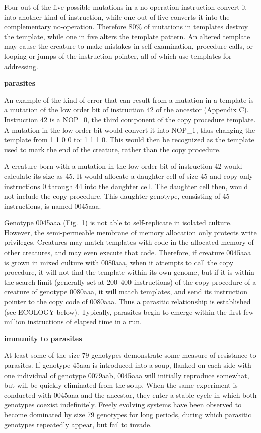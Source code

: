 Four out of the five possible mutations in a no-operation instruction convert
it into another kind of instruction, while one out of five converts it into
the complementary no-operation.  Therefore 80\% of mutations in templates
destroy the template, while one in five alters the template pattern.  An
altered template may cause the creature to make mistakes in self examination,
procedure calls, or looping or jumps of the instruction pointer, all of which
use templates for addressing.

\LP
\bf parasites\rm
\eLP

An example of the kind of error that can result from a mutation in a
template is a mutation of the low order bit of instruction 42 of the
ancestor (Appendix C).  Instruction 42 is a NOP\_0, the third component
of the copy procedure template.  A mutation in the low order bit would
convert it into NOP\_1, thus changing the template from 1 1 0 0 to: 1 1 1 0.
This would then be recognized as the template used to mark the end of the
creature, rather than the copy procedure.

A creature born with a mutation in the low order bit of instruction 42 would
calculate its size as 45.  It would allocate a daughter cell of size 45 and
copy only instructions 0 through 44 into the daughter cell.  The daughter
cell then, would not include the copy procedure.  This daughter genotype,
consisting of 45 instructions, is named 0045aaa.

Genotype 0045aaa (Fig.\ 1) is not able to self-replicate in isolated culture.
However, the semi-permeable membrane of memory allocation only protects write
privileges.  Creatures may match templates with code in the allocated memory
of other creatures, and may even execute that code.  Therefore, if creature
0045aaa is grown in mixed culture with 0080aaa, when it attempts to call the
copy procedure, it will not find the template within its own genome, but if
it is within the search limit (generally set at 200--400 instructions) of the
copy procedure of a creature of genotype 0080aaa, it will match templates, and
send its instruction pointer to the copy code of 0080aaa.  Thus a parasitic
relationship is established (see ECOLOGY below).  Typically, parasites begin
to emerge within the first few million instructions of elapsed time in a run.

\LP
\bf immunity to parasites\rm
\eLP

At least some of the size 79 genotypes demonstrate some measure of
resistance to parasites.  If genotype 45aaa is introduced into a soup,
flanked on each side with one individual of genotype 0079aab, 0045aaa will
initially reproduce somewhat, but will be quickly eliminated from the soup.
When the same experiment is conducted with 0045aaa and the ancestor, they
enter a stable cycle in which both genotypes coexist indefinitely.  Freely
evolving systems have been observed to become dominated by size 79 genotypes
for long periods, during which parasitic genotypes repeatedly appear, but
fail to invade.

